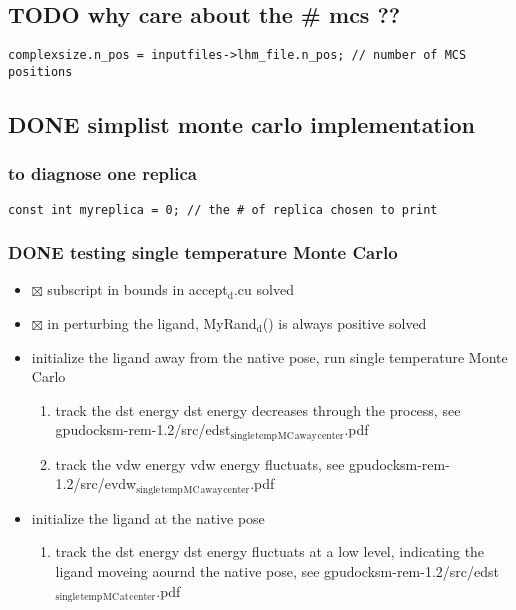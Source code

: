 \documentclass[11pt]{article}
\begin{document}
\subsection{{\bfseries\sffamily TODO} why care about the \# mcs ??}
\label{sec-3-3}
\begin{verbatim}
complexsize.n_pos = inputfiles->lhm_file.n_pos;	// number of MCS positions
\end{verbatim}

\subsection{{\bfseries\sffamily DONE} simplist monte carlo implementation}
\label{sec-3-4}

\subsubsection{to diagnose one replica}
\label{sec-3-4-1}
\begin{verbatim}
const int myreplica = 0; // the # of replica chosen to print
\end{verbatim}
\subsubsection{{\bfseries\sffamily DONE} testing single temperature Monte Carlo}
\label{sec-3-4-2}
\begin{itemize}
\item $\boxtimes$ subscript in bounds in accept$_{\text{d}}$.cu
solved
\item $\boxtimes$ in perturbing the ligand, MyRand$_{\text{d}}$() is always positive
solved
\item initialize the ligand away from the native pose, run single temperature Monte Carlo
\begin{enumerate}
\item track the dst energy
dst energy decreases through the process, see
gpudocksm-rem-1.2/src/edst$_{\text{single}}$$_{\text{temp}}$$_{\text{MC}}$$_{\text{away}}$$_{\text{center}}$.pdf
\item track the vdw energy
vdw energy fluctuats, see
gpudocksm-rem-1.2/src/evdw$_{\text{single}}$$_{\text{temp}}$$_{\text{MC}}$$_{\text{away}}$$_{\text{center}}$.pdf
\end{enumerate}
\item initialize the ligand at the native pose
\begin{enumerate}
\item track the dst energy
dst energy fluctuats at a low level, indicating the ligand moveing aournd the native pose, see
gpudocksm-rem-1.2/src/edst$_{\text{single}}$$_{\text{temp}}$$_{\text{MC}}$$_{\text{at}}$$_{\text{center}}$.pdf
\end{enumerate}
\end{itemize}
\end{document}
